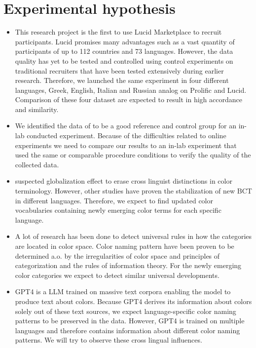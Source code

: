 \section{Experimental hypothesis}

\begin{itemize}
    \item This research project is the first to use Lucid Marketplace to recruit participants. Lucid promises many advantages such as a vast quantity of participants of up to 112 countries and 73 languages. However, the data quality has yet to be tested and controlled using control experiments on traditional recruiters that have been tested extensively during earlier research.
    Therefore, we launched the same experiment in four different languages, Greek, English, Italian and Russian analog on Prolific and Lucid. Comparison of these four dataset are expected to result in high accordance and similarity.
    \item We identified the data of \textcite{lindseyColor2014} to be a good reference and control group for an in-lab conducted experiment. Because of the difficulties related to online experiments we need to compare our results to an in-lab experiment that used the same or comparable procedure conditions to verify the quality of the collected data.
    \item \textcite{kayWorld2009} suspected globalization effect to erase cross linguist distinctions in color terminology. However, other studies have proven the stabilization of new BCT in different languages. Therefore, we expect to find updated color vocabularies containing newly emerging color terms for each specific language.
    \item A lot of research has been done to detect universal rules in how the categories are located in color space. Color naming pattern have been proven to be determined a.o. by the irregularities of color space and principles of categorization and the rules of information theory. 
    For the newly emerging color categories we expect to detect similar universal developments.
    \item GPT4 is a LLM trained on massive text corpora enabling the model to produce text about colors. Because GPT4 derives its information about colors solely out of these text sources, we expect language-specific color naming patterns to be preserved in the data. However, GPT4 is trained on multiple languages and therefore contains information about different color naming patterns. We will try to observe these cross lingual influences.
\end{itemize}